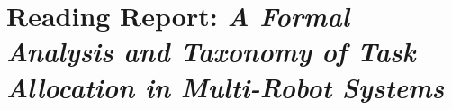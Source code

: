 




    \newpage

    \section{Reading Report: \emph{A Formal Analysis and Taxonomy of Task Allocation in Multi-Robot Systems}}
    \label{sec:Gerkey2004}
    \cite{Gerkey2004}
    
